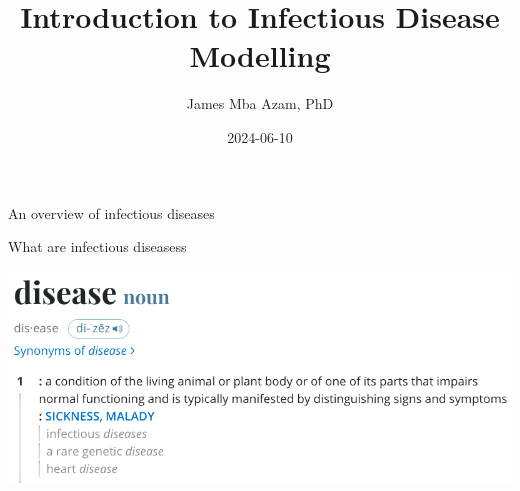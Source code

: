 \documentclass[
  ignorenonframetext,
]{beamer}
\title{Introduction to Infectious Disease Modelling}
\author{James Mba Azam, PhD}
\date{2024-06-10}
\begin{document}
\frame{\titlepage}

\begin{frame}{An overview of infectious diseases}
\label{an-overview-of-infectious-diseases}
\begin{block}{What are infectious diseasess}
\label{what-are-infectious-diseasess}
\begin{center}
\includegraphics{images/disease_definition.png}
\end{center}
\end{block}
\end{frame}
\end{document}
